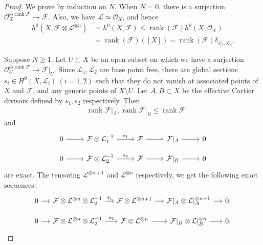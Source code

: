 \documentclass[12pt]{amsart}
\theoremstyle{plain}
\theoremstyle{definition}
\numberwithin{equation}{section}
\def\O{{ \mathcal{O}}}
\def\L{{ \mathcal{L}}}
\DeclareMathOperator{\rank}{rank}
\renewcommand{\d}{\delta}
\begin{document}
\begin{proof}
We prove by induction on $N$.
When $N = 0$, there is a surjection $\O_{X}^{ \oplus \rank \mathcal{F}} \longrightarrow \mathcal{F}$.
Also, we have $\L \simeq \O_{X}$, and hence
\begin{align}
h^{0}(X, \mathcal{F} \otimes \L^{ \otimes n}) &= h^{0}(X, \mathcal{F}) \leq \rank (\mathcal{F}) h^{0}(X, \O_{X}) \\
&= \rank (\mathcal{F}) ([X]) = \rank (\mathcal{F}) \d_{\L_{1}, \L_{2}}.
\end{align}

Suppose $N \geq 1$.
Let $U \subset X$ be an open subset on which we have a surjection
$\O_{U}^{\oplus \rank \mathcal{F}} \longrightarrow \mathcal{F}|_{U}$.
Since $\L_{1}, \L_{2}$ are base point free, there are global sections 
$s_{i} \in H^{0}(X, \L_{i}) \ (i=1,2)$ such that
they do not vanish at associated points of $X$ and $ \mathcal{F}$,
and any generic points of $X \setminus U$.
Let $A,B \subset X$ be the effective Cartier divisors defined by $s_{1},s_{2}$
respectively.
Then 
\begin{align}
&\rank \mathcal{F}|_{A}, \rank \mathcal{F}|_{B} \leq \rank \mathcal{F}
\end{align}
and
\begin{equation}
\begin{tikzcd}[row sep=small] 
0 \arrow[r] & \mathcal{F} \otimes \L_{1}^{-1} \arrow[r,"s_{1}"] & \mathcal{F} \arrow[r] & \mathcal{F}|_{A} \arrow[r] & 0\\
0 \arrow[r] & \mathcal{F} \otimes \L_{2}^{-1} \arrow[r,"s_{2}"] & \mathcal{F} \arrow[r] & \mathcal{F}|_{B} \arrow[r] & 0
\end{tikzcd}
\end{equation}
are exact.
The tensoring $\L^{ \otimes n+1}$ and $\L^{ \otimes n}$ respectively, we get the following exact sequences:
\begin{equation}
\begin{tikzcd}[row sep=small, column sep = small] 
0 \arrow[r] & \mathcal{F} \otimes  \L^{ \otimes n} \otimes \L_{2}^{-1} \arrow[r,"s_{1}"] & \mathcal{F}  \otimes \L^{ \otimes n+1} \arrow[r] & \mathcal{F}|_{A}\otimes \L|_{A}^{ \otimes n+1} \arrow[r] & 0,\\
0 \arrow[r] & \mathcal{F} \otimes  \L^{ \otimes n} \otimes \L_{2}^{-1} \arrow[r,"s_{2}"] & \mathcal{F}  \otimes \L^{ \otimes n} \arrow[r] & \mathcal{F}|_{B}\otimes \L|_{B}^{ \otimes n} \arrow[r] & 0.
\end{tikzcd}
\end{equation}

\end{proof}
\end{document}
